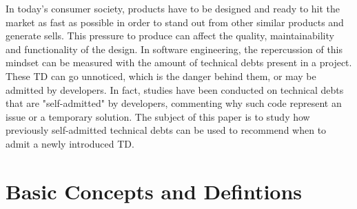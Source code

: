 

\label{sec:Introduction}  


\setlength{\parindent}{5ex} In today's consumer society, products have to be designed and ready to hit the market as fast as possible in order to stand out from other similar products and generate sells. This pressure to produce can affect the quality, maintainability and functionality of the design. In software engineering, the repercussion of this mindset can be measured with the amount of technical debts present in a project. These \ac{TD} can go unnoticed, which is the danger behind them, or may be admitted by developers. In fact, studies have been conducted on technical debts that are "self-admitted" by developers, commenting why such code represent an issue or a temporary solution. The subject of this paper is to study how previously self-admitted technical debts can be used to recommend when to admit a newly introduced \ac{TD}.

\section{Basic Concepts and Defintions}  


